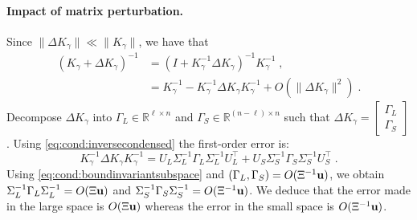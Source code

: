 \paragraph{Impact of matrix perturbation.}
Since $\|\Delta K_\gamma\| \ll \|K_\gamma\|$, we have that
\begin{equation}
  \label{eq:cond:invperturbed}
  \begin{aligned}
    (K_\gamma + \Delta K_\gamma)^{-1} &= (I + K_\gamma^{-1} \Delta K_\gamma)^{-1} K_\gamma^{-1} \; , \\
                                      &= K_\gamma^{-1} - K_\gamma^{-1}\Delta K_\gamma K_\gamma^{-1} + O(\|\Delta K_\gamma\|^2) \; .
  \end{aligned}
\end{equation}
Decompose $\Delta K_\gamma$ into
$\Gamma_L \in \mathbb{R}^{\ell \times n}$ and $\Gamma_S \in \mathbb{R}^{(n-\ell) \times n}$ such that
$\Delta K_\gamma = \begin{bmatrix}
  \Gamma_L \\ \Gamma _S
\end{bmatrix}$.
Using \eqref{eq:cond:inversecondensed} the first-order error is:
\begin{equation}
  \label{eq:cond:inversecondensederror}
  K_\gamma^{-1}\Delta K_\gamma K_\gamma^{-1}  =
U_L \Sigma_L^{-1} \Gamma_L \Sigma_L^{-1}U_L^\top  +
  U_S \Sigma_S^{-1} \Gamma_S \Sigma_S^{-1}U_S^\top  \;.
\end{equation}
Using \eqref{eq:cond:boundinvariantsubspace} and $(\Gamma_L, \Gamma_S)= O( \Xi^{-1}\mathbf{u})$,
we obtain $\Sigma_L^{-1} \Gamma_L \Sigma_L^{-1} = O(\Xi \mathbf{u})$
and $\Sigma_S^{-1} \Gamma_S \Sigma_S^{-1} = O(\Xi^{-1} \mathbf{u})$.
We deduce that the error made in the large space is $O(\Xi\mathbf{u})$ whereas
the error in the small space is $O(\Xi^{-1}\mathbf{u} )$.


